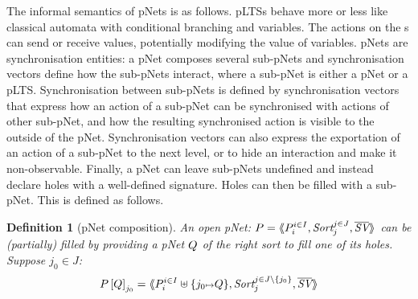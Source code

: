 \documentclass{lmcs}
\newtheorem{definition}{Definition}
\begin{document}
The informal semantics of pNets is as follows. pLTSs behave more or less like  classical automata with conditional branching and variables. The actions on the \pLTS s can send or receive values, potentially modifying the value of variables. 
pNets are synchronisation entities: a pNet composes several sub-pNets and  synchronisation vectors define how the sub-pNets interact, where a sub-pNet is either a pNet or a pLTS. Synchronisation between sub-pNets is defined by synchronisation vectors that express how an action of a sub-pNet can be synchronised with actions of other sub-pNet, and how the resulting synchronised action is visible to the outside of the pNet. Synchronisation vectors can also express the exportation of an action of a sub-pNet to the next level, or to hide an interaction and make it non-observable. Finally, a pNet can leave sub-pNets undefined and instead declare holes with a well-defined signature. Holes can then be filled with a sub-pNet. This is defined as follows.



\begin{definition}[pNet composition]
	An open pNet: $\pNet = \mylangle \pNet_i^{i\in I}, \Sort_j^{j\in J}, 
	\set{\symb{SV}}\myrangle$
 can be (partially) filled by providing  a pNet $Q$ of the
	right sort to fill one of  its holes.	
	Suppose $j_0\in J$:
	\[\pNet\left[\pNetQ\right]_{j_0}= \mylangle 
	\pNet_i^{i\in I}\uplus\{j_0\mapsto \pNetQ\},\Sort_j^{j\in J\setminus \{j_0\}},
	\set{\symb{SV}}\myrangle
	\]
\end{definition}
\end{document}
